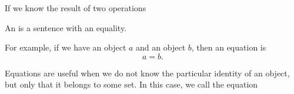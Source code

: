 

If we know the result of two operations


An  is a sentence
with an equality.

For example, if we have an object $a$
and an object $b$, then an equation
is
\[
  a = b.
\]

Equations are useful when we do not
know the particular identity of an
object, but only that it belongs to
some set.
In this case, we call the
equation 

